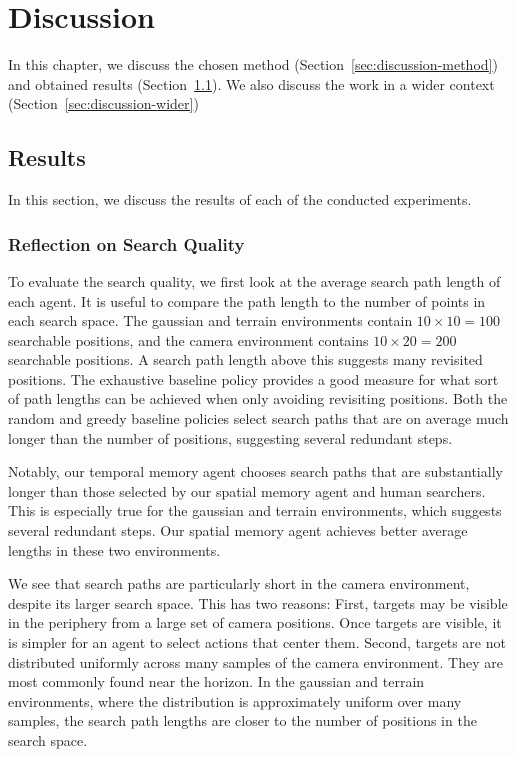\chapter{Discussion}
\label{cha:discussion}

In this chapter, we discuss the chosen method (Section~\ref{sec:discussion-method}) and obtained results (Section~\ref{sec:discussion-results}).
We also discuss the work in a wider context (Section~\ref{sec:discussion-wider})

\section{Results}
\label{sec:discussion-results}

In this section, we discuss the results of each of the conducted experiments.

\subsection{Reflection on Search Quality}

To evaluate the search quality, we first look at the average search path length of each agent.
It is useful to compare the path length to the number of points in each search space.
The gaussian and terrain environments contain \(10 \times 10 = 100\) searchable positions, and the camera environment contains \(10 \times 20 = 200\) searchable positions.
A search path length above this suggests many revisited positions.
The exhaustive baseline policy provides a good measure for what sort of path lengths can be achieved when only avoiding revisiting positions.
Both the random and greedy baseline policies select search paths that are on average much longer than the number of positions, suggesting several redundant steps.

Notably, our temporal memory agent chooses search paths that are substantially longer than those selected by our spatial memory agent and human searchers.
This is especially true for the gaussian and terrain environments, which suggests several redundant steps.
Our spatial memory agent achieves better average lengths in these two environments.

We see that search paths are particularly short in the camera environment,
despite its larger search space.
This has two reasons:
First, targets may be visible in the periphery from a large set of camera positions.
Once targets are visible, it is simpler for an agent to select actions that center them.
Second, targets are not distributed uniformly across many samples of the camera environment.
They are most commonly found near the horizon.
In the gaussian and terrain environments, where the distribution is approximately uniform over many samples, the search path lengths are closer to the number of positions in the search space.

